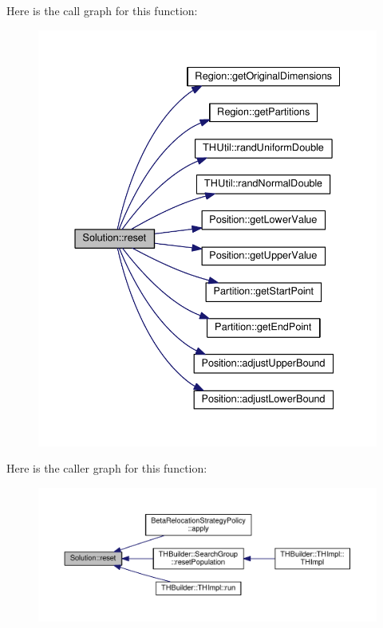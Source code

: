 Here is the call graph for this function\+:
\nopagebreak
\begin{figure}[H]
\begin{center}
\leavevmode
\includegraphics[width=350pt]{classSolution_a84c713b707a570add53e85a28196bb3e_cgraph}
\end{center}
\end{figure}




Here is the caller graph for this function\+:
\nopagebreak
\begin{figure}[H]
\begin{center}
\leavevmode
\includegraphics[width=350pt]{classSolution_a84c713b707a570add53e85a28196bb3e_icgraph}
\end{center}
\end{figure}



